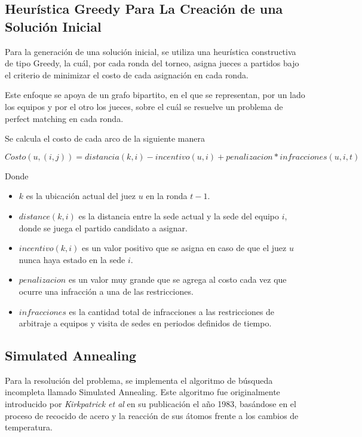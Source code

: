\documentclass[letter, 10pt]{article}
\begin{document}
\subsection{Heur\'istica Greedy Para La Creaci\'on de una Soluci\'on Inicial}

Para la generaci\'on de una soluci\'on inicial, se utiliza una heur\'istica constructiva de tipo Greedy, la cu\'al, por cada ronda del torneo, asigna jueces a partidos bajo el criterio de minimizar el costo de cada asignaci\'on en cada ronda.

Este enfoque se apoya de un grafo bipartito, en el que se representan, por un lado los equipos y por el otro los jueces, sobre el cu\'al se resuelve un problema de perfect matching en cada ronda.

Se calcula el costo de cada arco de la siguiente manera

\begin{equation}
  Costo(u, (i, j)) = distancia(k, i) - incentivo(u, i) + penalizacion * infracciones(u, i, t)
\end{equation}

Donde
\begin{itemize}
  \item $k$ es la ubicaci\'on actual del juez $u$ en la ronda $t - 1$.
  \item $distance(k, i)$ es la distancia entre la sede actual y la sede del equipo $i$, donde se juega el partido candidato a asignar.
  \item $incentivo(k, i)$ es un valor positivo que se asigna en caso de que el juez $u$ nunca haya estado en la sede $i$.
  \item $penalizacion$ es un valor muy grande que se agrega al costo cada vez que ocurre una infracci\'on a una de las restricciones.
  \item $infracciones$ es la cantidad total de infracciones a las restricciones de arbitraje a equipos y visita de sedes en periodos definidos de tiempo.
\end{itemize}

\subsection{Simulated Annealing}

Para la resoluci\'on del problema, se implementa el algoritmo de b\'usqueda incompleta llamado Simulated Annealing.
Este algoritmo fue originalmente introducido por \emph{Kirkpatrick et al}\cite{Kirkpatrick1983} en su publicaci\'on el a\~no 1983, bas\'andose en el proceso de recocido de acero y la reacci\'on de sus \'atomos frente a los cambios de temperatura.
\end{document}
